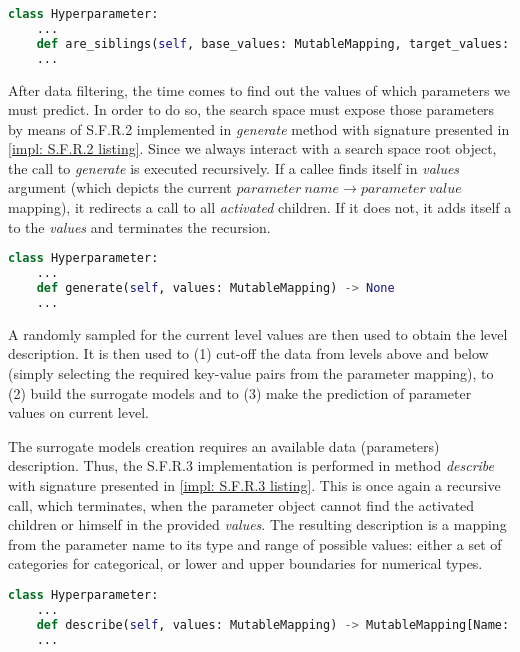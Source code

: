 \begin{lstlisting}[language=Python, caption=S.F.R.1 implementation., label=impl: S.F.R.1 listing]
class Hyperparameter:
	...
    def are_siblings(self, base_values: MutableMapping, target_values: MutableMapping) -> bool
	...
\end{lstlisting}

After data filtering, the time comes to find out the values of which parameters we must predict. In order to do so, the search space must expose those parameters by means of S.F.R.2 implemented in \emph{generate} method with signature presented in \cref{impl: S.F.R.2 listing}. Since we always interact with a search space root object, the call to \emph{generate} is executed recursively. If a callee finds itself in \emph{values} argument (which depicts the current $parameter\ name \rightarrow parameter\ value$ mapping), it redirects a call to all \textit{activated} children. If it does not, it adds itself a to the \emph{values} and terminates the recursion.

\begin{lstlisting}[language=Python, caption=S.F.R.2 implementation., label=impl: S.F.R.2 listing]
class Hyperparameter:
	...
    def generate(self, values: MutableMapping) -> None
	...
\end{lstlisting}

A randomly sampled for the current level values are then used to obtain the level description. It is then used to (1) cut-off the data from levels above and below (simply selecting the required key-value pairs from the parameter mapping), to (2) build the surrogate models and to (3) make the prediction of parameter values on current level.

The surrogate models creation requires an available data (parameters) description. Thus, the S.F.R.3 implementation is performed in method \emph{describe} with signature presented in \cref{impl: S.F.R.3 listing}. This is once again a recursive call, which terminates, when the parameter object cannot find the activated children or himself in the provided \emph{values}. The resulting description is a mapping from the parameter name to its type and range of possible values: either a set of categories for categorical, or lower and upper boundaries for numerical types.

\begin{lstlisting}[language=Python, caption=S.F.R.3 implementation., label=impl: S.F.R.3 listing]
class Hyperparameter:
	...
    def describe(self, values: MutableMapping) -> MutableMapping[Name: [Type, Values]]
	...
\end{lstlisting}

